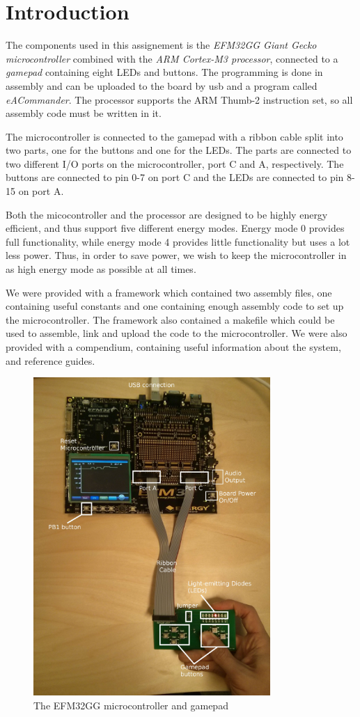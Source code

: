 \section{Introduction}

The components used in this assignement is the \textit{EFM32GG Giant Gecko microcontroller} combined with
the \textit{ARM Cortex-M3 processor}, connected to a \textit{gamepad} containing eight LEDs and buttons. The programming
is done in assembly and can be uploaded to the board by usb and a program called \textit{eACommander}. The processor supports the ARM Thumb-2 instruction set, so all assembly code must be written in it. 

The microcontroller is connected to the gamepad with a ribbon cable split into two parts, one for the buttons and one for the LEDs. The parts are connected to two different I/O ports on the microcontroller, port C and A, respectively. The buttons are connected to pin 0-7 on port C and the LEDs are connected to pin 8-15 on port A. 

Both the micocontroller and the processor are designed to be highly energy efficient, and thus support five different energy modes. Energy mode 0 provides full functionality, while energy mode 4 provides little functionality but uses a lot less power. Thus, in order to save power, we wish to keep the microcontroller in as high energy mode as possible at all times. 

We were provided with a framework which contained two assembly files, one containing useful constants and one containing enough assembly code to set up the microcontroller. The framework also contained a makefile which could be used to assemble, link and upload the code to the microcontroller. We were also provided with a compendium\cite{compendium}, containing useful information about the 
system, and reference guides\cite{cortex}\cite{efm32gg}.

\begin{figure}[ht]
    \centering
      \includegraphics[width=9cm]{figures/efm32gg}
    \caption{The EFM32GG microcontroller and gamepad\cite{compendium}}
    \label{figure_ef32gg}
\end{figure}


